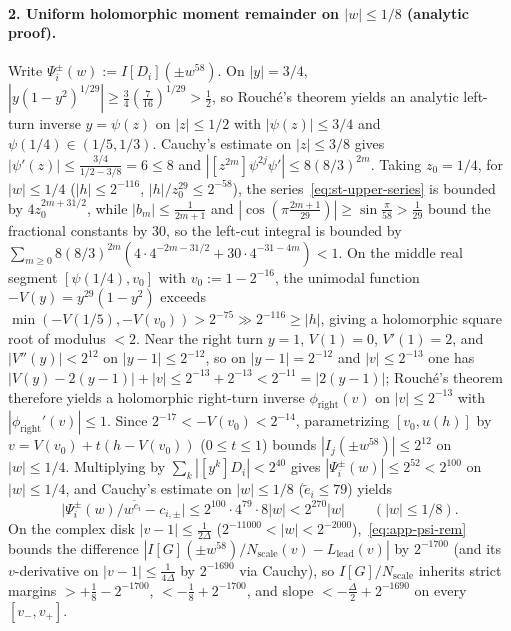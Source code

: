 \paragraph{2. Uniform holomorphic moment remainder on $|w|\le 1/8$ (analytic proof).}
Write $\Psi_i^\pm(w):=I[D_i](\pm w^{58})$. On $|y|=3/4$, $|y(1-y^2)^{1/29}|\ge\frac{3}{4}(\frac{7}{16})^{1/29}>\frac{1}{2}$, so Rouch\'e's theorem yields an analytic left-turn inverse $y=\psi(z)$ on $|z|\le 1/2$ with $|\psi(z)|\le 3/4$ and $\psi(1/4)\in(1/5,1/3)$. Cauchy's estimate on $|z|\le 3/8$ gives $|\psi'(z)|\le\frac{3/4}{1/2-3/8}=6\le 8$ and $|[z^{2m}]\psi^{2j}\psi'|\le 8(8/3)^{2m}$. Taking $z_0=1/4$, for $|w|\le 1/4$ ($|h|\le 2^{-116}$, $|h|/z_0^{29}\le 2^{-58}$), the series~\eqref{eq:st-upper-series} is bounded by $4z_0^{2m+31/2}$, while $|b_m|\le\frac{1}{2m+1}$ and $|\cos(\pi\frac{2m+1}{29})|\ge\sin\frac{\pi}{58}>\frac{1}{29}$ bound the fractional constants by $30$, so the left-cut integral is bounded by $\sum_{m\ge 0}8(8/3)^{2m}(4\cdot 4^{-2m-31/2}+30\cdot 4^{-31-4m})<1$. On the middle real segment $[\psi(1/4),v_0]$ with $v_0:=1-2^{-16}$, the unimodal function $-V(y)=y^{29}(1-y^2)$ exceeds $\min(-V(1/5),-V(v_0))>2^{-75}\gg 2^{-116}\ge|h|$, giving a holomorphic square root of modulus $<2$. Near the right turn $y=1$, $V(1)=0$, $V'(1)=2$, and $|V''(y)|<2^{12}$ on $|y-1|\le 2^{-12}$, so on $|y-1|=2^{-12}$ and $|v|\le 2^{-13}$ one has $|V(y)-2(y-1)|+|v|\le 2^{-13}+2^{-13}<2^{-11}=|2(y-1)|$; Rouch\'e's theorem therefore yields a holomorphic right-turn inverse $\phi_{\mathrm{right}}(v)$ on $|v|\le 2^{-13}$ with $|\phi_{\mathrm{right}}'(v)|\le 1$. Since $2^{-17}<-V(v_0)<2^{-14}$, parametrizing $[v_0,u(h)]$ by $v=V(v_0)+t(h-V(v_0))$ ($0\le t\le 1$) bounds $|I_j(\pm w^{58})|\le 2^{12}$ on $|w|\le 1/4$. Multiplying by $\sum_k|[y^k]D_i|<2^{40}$ gives $|\Psi_i^\pm(w)|\le 2^{52}<2^{100}$ on $|w|\le 1/4$, and Cauchy's estimate on $|w|\le 1/8$ ($\tilde{e}_i\le 79$) yields
\begin{equation}\label{eq:app-psi-rem}
  \bigl|\Psi_i^\pm(w)/w^{\tilde{e}_i} - c_{i,\pm}\bigr| \le 2^{100}\cdot 4^{79}\cdot 8|w| < 2^{270}|w| \qquad (|w|\le 1/8).
\end{equation}
On the complex disk $|v-1|\le\frac{1}{2\Delta}$ ($2^{-11000}<|w|<2^{-2000}$),~\eqref{eq:app-psi-rem} bounds the difference $|I[G](\pm w^{58})/N_{\mathrm{scale}}(v)-L_{\mathrm{lead}}(v)|$ by $2^{-1700}$ (and its $v$-derivative on $|v-1|\le\frac{1}{4\Delta}$ by $2^{-1690}$ via Cauchy), so $I[G]/N_{\mathrm{scale}}$ inherits strict margins $>+\frac{1}{8}-2^{-1700}$, $<-\frac{1}{8}+2^{-1700}$, and slope $<-\frac{\Delta}{2}+2^{-1690}$ on every $[v_-,v_+]$.

